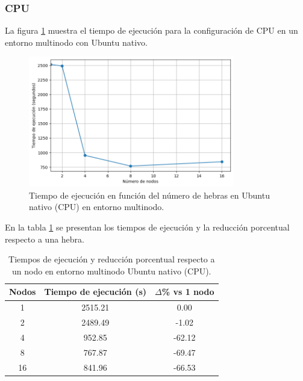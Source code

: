 \subsubsection{CPU}

La figura \ref{fig:multi-node_ubuntu_cpu_native_time} muestra el tiempo de ejecución para la configuración de CPU en un entorno multinodo con Ubuntu nativo.

\begin{figure}[H]
    \centering
    \includegraphics[width=0.8\textwidth]{imagenes/cap5/multi-node_ubuntu_cpu_native_time.png}
    \caption{Tiempo de ejecución en función del número de hebras en Ubuntu nativo (CPU) en entorno multinodo.}
    \label{fig:multi-node_ubuntu_cpu_native_time}
\end{figure}

En la tabla \ref{tab:multi-node_ubuntu_cpu_native} se presentan los tiempos de ejecución y la reducción porcentual respecto a una hebra.

\begin{table}[ht]
    \centering
    \begin{tabular}{|c|c|c|}
        \hline
        \textbf{Nodos} & \textbf{Tiempo de ejecución (s)} & \textbf{$\Delta$\% vs 1 nodo} \\
        \hline
        1              & 2515.21                          & 0.00                          \\
        2              & 2489.49                          & -1.02                         \\
        4              & 952.85                           & -62.12                        \\
        8              & 767.87                           & -69.47                        \\
        16             & 841.96                           & -66.53                        \\
        \hline
    \end{tabular}
    \caption{Tiempos de ejecución y reducción porcentual respecto a un nodo en entorno multinodo Ubuntu nativo (CPU).}
    \label{tab:multi-node_ubuntu_cpu_native}
\end{table}

